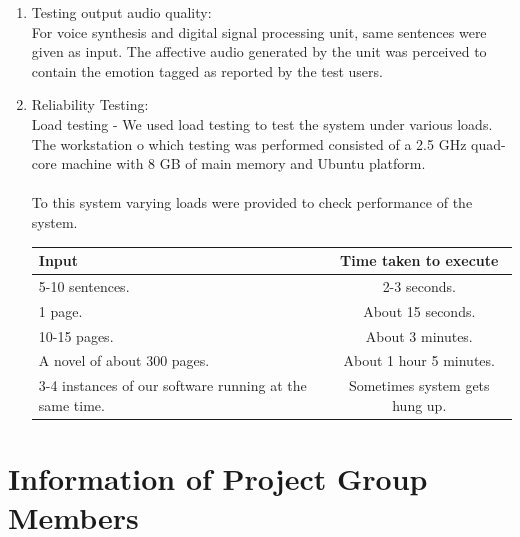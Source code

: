 \documentclass[oneside,a4paper,12pt]{book}
\begin{document}
\begin{appendices}
\begin{enumerate}
\item[] Testing output audio quality:\\
For voice synthesis and digital signal processing unit, same sentences were given as input. The affective audio generated by the unit was perceived to contain the emotion tagged as reported by the test users.\\

\item[] Reliability Testing:\\
Load testing - We used load testing to test the system under various loads. The workstation o which testing was performed consisted of a 2.5 GHz quad-core machine with 8 GB of main memory and Ubuntu platform.\\\\

To this system varying loads were provided to check performance of the system.\\
\begin{table}[!htbp]
	\begin{center}
		\def\arraystretch{1.5}
		\begin{tabularx}{\textwidth}{|X|c|}
			\hline 
			Input	& Time taken to execute \\ \hline
			5-10 sentences. & 2-3 seconds. \\ \hline
			1 page. & About 15 seconds. \\ \hline
			10-15 pages. & About 3 minutes. \\ \hline
			A novel of about 300 pages. & About 1 hour 5 minutes. \\ \hline
			3-4 instances of our software running at the same time. & Sometimes system gets hung up. \\ \hline
		\end{tabularx}
	\end{center}
	\label{tab:testcases}
\end{table}
\end{enumerate}
\chapter{Information of Project Group Members}
\newpage


\end{appendices}
\end{document}
